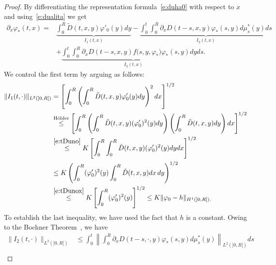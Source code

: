 \documentclass[11pt,leqno]{amsart}
\numberwithin{equation}{section}
\begin{document}
\begin{proof}
By differentiating the representation formula~\eqref{e:duha0} with respect to $x$ and using~\eqref{e:dualita} we get 
\begin{equation}
  \label{e:duha1}
  \begin{split}
    \partial_x {\varphi}_\ast (t, x) = & \underbrace{\int_0^R \tilde D(t,
      x, y) {\varphi}'_0(y) dy}_{I_1(t, x)} - \underbrace{\int_0^t \! \!
      \int_0^R \partial_x D(t-s, x, y) {\varphi}_\ast (s, y) d \mu^\ast_s
      (y) ds}_{I_2 (t, x)}
    \\
    & + \underbrace{\int_0^t \! \! \int_0^R \partial_x D(t-s, x, y) f \big
      (s, y, {\varphi}_\ast \big)
      {\varphi}_\ast(s, y) dy ds.}_{I_3(t, x)} 
  \end{split}
\end{equation}
We control the first term by arguing as follows: 
\begin{equation}
\label{e:izero}
\begin{split}
  \| I_1 (t, \cdot) \|_{L^2 (]0, R[)} & = 
  \left[ \int_0^R  \left(
  \int_0^R \tilde D(t, x, y) {\varphi}'_0(y)  dy \right)^2 dx \right]^{1/2}
  \\
  & \stackrel{\text{H{\"o}lder}}{\leq} 
  \left[
  \int_0^R \left(  \int_0^R 
  \tilde D(t, x, y) ({\varphi}'_0)^2 (y)  dy  
  \right) 
  \left(
  \int_0^R
  \tilde D(t, x, y)   dy
  \right) dx \right]^{1/2} \\ &
  \stackrel{\eqref{e:tDuno}}{\leq} 
  K 
  \left[
  \int_0^R   \int_0^R 
  \tilde D(t, x, y) ({\varphi}'_0)^2 (y)  dy  dx 
  \right]^{1/2} \\
  &  \leq 
  K 
  \left(
  \int_0^R ({\varphi}'_0)^2 (y)   \int_0^R 
  \tilde D(t, x, y)   dx \, dy 
  \right)^{1/2}
  \\ & 
  \stackrel{\eqref{e:tDunox}}{\leq} K   \left[
  \int_0^R ({\varphi}'_0)^2 (y)  
  \right]^{1/2} 
   \leq K \| {\varphi}_0 -h \|_{H^1 (]0, R[).} \phantom{\int} \\
\end{split}
\end{equation}
To establish the last inequality, we have used the fact that $h$ is a constant. 
Owing to the Bochner Theorem~\cite[p.473]{Salsa}, we have 
\begin{equation}
\label{e:iuno}
\begin{split}
    \| I_2 (t, \cdot) \|_{L^2 (]0, R[)} & 
    \leq \int_0^t \left\|  
     \int_0^R \partial_x 
    D(t-s, \cdot, y) {\varphi}_\ast (s, y) d \mu^\ast_s (y)  \right\|_{L^2(]0, R[)} ds \\

\end{split}
\end{equation}
\end{proof}
\end{document}
